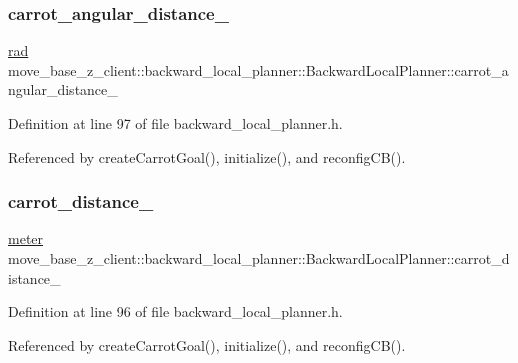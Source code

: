 \subsubsection{\texorpdfstring{carrot\+\_\+angular\+\_\+distance\+\_\+}{carrot\_angular\_distance\_}}
{\footnotesize\ttfamily \hyperlink{backward__local__planner_8h_a640effbe91ae9b25d698a883a9e80d96}{rad} move\+\_\+base\+\_\+z\+\_\+client\+::backward\+\_\+local\+\_\+planner\+::\+Backward\+Local\+Planner\+::carrot\+\_\+angular\+\_\+distance\+\_\+\hspace{0.3cm}{\ttfamily [private]}}



Definition at line 97 of file backward\+\_\+local\+\_\+planner.\+h.



Referenced by create\+Carrot\+Goal(), initialize(), and reconfig\+C\+B().

\mbox{\label{classmove__base__z__client_1_1backward__local__planner_1_1BackwardLocalPlanner_a6dc3aa0ff63f9f7d0aae852755734b5d}} 
\subsubsection{\texorpdfstring{carrot\+\_\+distance\+\_\+}{carrot\_distance\_}}
{\footnotesize\ttfamily \hyperlink{backward__local__planner_8h_ab6024a26b088c11b8a5218a469ae5a57}{meter} move\+\_\+base\+\_\+z\+\_\+client\+::backward\+\_\+local\+\_\+planner\+::\+Backward\+Local\+Planner\+::carrot\+\_\+distance\+\_\+\hspace{0.3cm}{\ttfamily [private]}}



Definition at line 96 of file backward\+\_\+local\+\_\+planner.\+h.



Referenced by create\+Carrot\+Goal(), initialize(), and reconfig\+C\+B().

